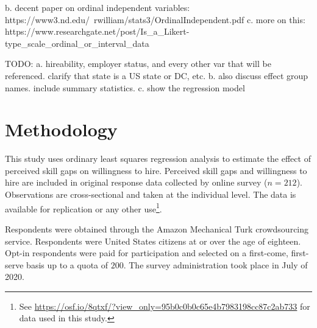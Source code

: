 \documentclass[review]{elsarticle}
\begin{document}
b. decent paper on ordinal independent variables: https://www3.nd.edu/~rwilliam/stats3/OrdinalIndependent.pdf
c. more on this: https://www.researchgate.net/post/Is_a_Likert-type_scale_ordinal_or_interval_data

TODO:
a. hireability, employer status, and every other var that will be referenced. clarify that state is a US state or DC, etc.
b. also discuss effect group names. include summary statistics.
c. show the regression model

\section{Methodology}


This study uses ordinary least squares regression analysis to estimate the effect of perceived skill gaps on willingness to hire.
Perceived skill gaps and willingness to hire are included in original response data collected by online survey ($n = 212$).
Observations are cross-sectional and taken at the individual level.
The data is available for replication or any other use\footnote{
    See \url{https://osf.io/8qtxf/?view_only=95b0c0b0c65e4b7983198cc87c2ab733}
    for data used in this study.
}.

Respondents were obtained through the Amazon Mechanical Turk crowdsourcing service.
Respondents were United States citizens at or over the age of eighteen.
Opt-in respondents were paid for participation and selected on a first-come, first-serve basis up to a quota of $200$.
The survey administration took place in July of 2020.
\end{document}
